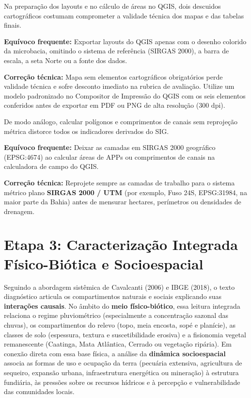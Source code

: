 Na preparação dos layouts e no cálculo de áreas no QGIS, dois descuidos cartográficos costumam comprometer a validade técnica dos mapas e das tabelas finais.

\begin{boxErro}
\textbf{Equívoco frequente:} Exportar layouts do QGIS apenas com o desenho colorido da microbacia, omitindo o sistema de referência (SIRGAS 2000), a barra de escala, a seta Norte ou a fonte dos dados.\par
\textbf{Correção técnica:} Mapa sem elementos cartográficos obrigatórios perde validade técnica e sofre desconto imediato na rubrica de avaliação. Utilize um modelo padronizado no Compositor de Impressão do QGIS com os seis elementos conferidos antes de exportar em PDF ou PNG de alta resolução ($300\text{ dpi}$).
\end{boxErro}

De modo análogo, calcular polígonos e comprimentos de canais sem reprojeção métrica distorce todos os indicadores derivados do SIG.

\begin{boxErro}
\textbf{Equívoco frequente:} Deixar as camadas em SIRGAS 2000 geográfico (EPSG:4674) ao calcular áreas de APPs ou comprimentos de canais na calculadora de campo do QGIS.\par
\textbf{Correção técnica:} Reprojete sempre as camadas de trabalho para o sistema métrico plano \textbf{SIRGAS 2000 / UTM} (por exemplo, Fuso 24S, EPSG:31984, na maior parte da Bahia) antes de mensurar hectares, perímetros ou densidades de drenagem.
\end{boxErro}

\section{Etapa 3: Caracterização Integrada Físico-Biótica e Socioespacial}

Seguindo a abordagem sistêmica de Cavalcanti (2006) e IBGE (2018), o texto diagnóstico articula os compartimentos naturais e sociais explicando suas \textbf{interações causais}. No âmbito do \textbf{meio físico-biótico}, essa leitura integrada relaciona o regime pluviométrico (especialmente a concentração sazonal das chuvas), os compartimentos do relevo (topo, meia encosta, sopé e planície), as classes de solo (espessura, textura e suscetibilidade erosiva) e a fisionomia vegetal remanescente (Caatinga, Mata Atlântica, Cerrado ou vegetação ripária). Em conexão direta com essa base física, a análise da \textbf{dinâmica socioespacial} associa as formas de uso e ocupação da terra (pecuária extensiva, agricultura de sequeiro, expansão urbana, infraestrutura energética ou mineração) à estrutura fundiária, às pressões sobre os recursos hídricos e à percepção e vulnerabilidade das comunidades locais.

